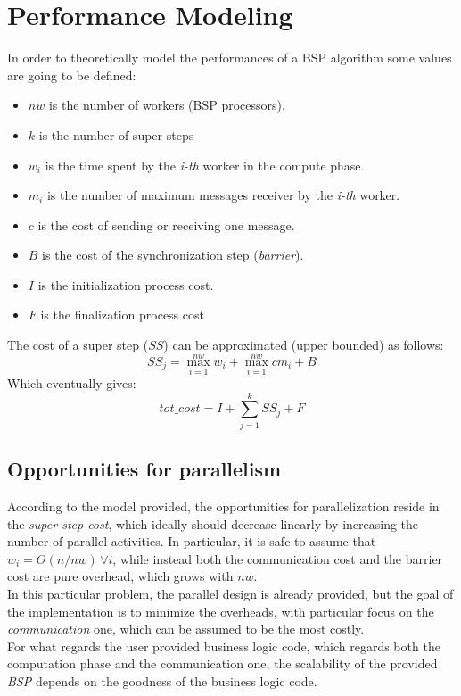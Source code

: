 \documentclass[]{article}
\begin{document}
\section{Performance Modeling}
\label{sec:perfModel}

In order to theoretically model the performances of a BSP algorithm some values are going to be defined:
\begin{itemize}
	\item $\mathit{nw}$ is the number of workers (BSP processors).
	\item $k$ is the number of super steps
	\item $w_i$ is the time spent by the \emph{i-th} worker in the compute phase.
	\item $m_i$ is the number of maximum messages receiver by the \emph{i-th} worker.
	\item $c$ is the cost of sending or receiving one message.
	\item $B$ is the cost of the synchronization step (\emph{barrier}).
	\item $I$ is the initialization process cost.
	\item $F$ is the finalization process cost
\end{itemize}
The cost of a super step ($\mathit{SS}$) can be approximated (upper bounded) as follows:
$$ \mathit{SS}_j = \max_{i=1}^{\mathit{nw}} w_i + \max_{i=1}^{\mathit{nw}} c m_i + B $$
Which eventually gives:
$$ \mathit{tot\_cost} = I + \sum_{j=1}^{k} \mathit{SS}_j + F $$
\subsection{Opportunities for parallelism}
According to the model provided, the opportunities for parallelization reside in the \emph{super step cost}, which ideally should decrease linearly by increasing the number of parallel activities. In particular, it is safe to assume that $w_i = \Theta(n/\mathit{nw}) \, \forall i$, while instead both the communication cost and the barrier cost are pure overhead, which grows with $\mathit{nw}$. \\
In this particular problem, the parallel design is already provided, but the goal of the implementation is to minimize the overheads, with particular focus on the \emph{communication} one, which can be assumed to be the most costly. \\

For what regards the user provided business logic code, which regards both the computation phase and the communication one, the scalability of the provided \emph{BSP} depends on the goodness of the business logic code.
\end{document}
